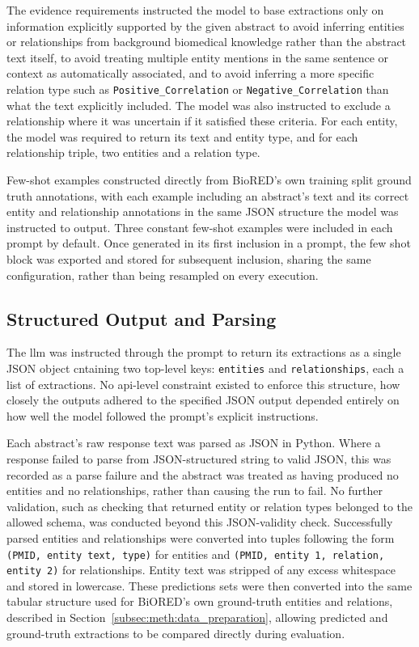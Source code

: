 The evidence requirements instructed the model to base extractions only on information explicitly supported by the given abstract to avoid inferring entities or relationships from background biomedical knowledge rather than the abstract text itself, to avoid treating multiple entity mentions in the same sentence or context as automatically associated, and to avoid inferring a more specific relation type such as \verb|Positive_Correlation| or \verb|Negative_Correlation| than what the text explicitly included. The model was also instructed to exclude a relationship where it was uncertain if it satisfied these criteria. For each entity, the model was required to return its text and entity type, and for each relationship triple, two entities and a relation type.

Few-shot examples constructed directly from BioRED's own training split ground truth annotations, with each example including an abstract's text and its correct entity and relationship annotations in the same JSON structure the model was instructed to output. Three constant few-shot examples were included in each prompt by default. Once generated in its first inclusion in a prompt, the few shot block was exported and stored for subsequent inclusion, sharing the same configuration, rather than being resampled on every execution.

\subsection{Structured Output and Parsing}
\label{subsec:meth:structured_output_and_parsing}
The \gls{llm} was instructed through the prompt to return its extractions as a single JSON object cntaining two top-level keys: \texttt{entities} and \texttt{relationships}, each a list of extractions. No \gls{api}-level constraint existed to enforce this structure, how closely the outputs adhered to the specified JSON output depended entirely on how well the model followed the prompt's explicit instructions.

Each abstract's raw response text was parsed as JSON in Python. Where a response failed to parse from JSON-structured string to valid JSON, this was recorded as a parse failure and the abstract was treated as having produced no entities and no relationships, rather than causing the run to fail. No further validation, such as checking that returned entity or relation types belonged to the allowed schema, was conducted beyond this JSON-validity check. Successfully parsed entities and relationships were converted into tuples following the form \texttt{(PMID, entity text, type)} for entities and \texttt{(PMID, entity 1, relation, entity 2)} for relationships. Entity text was stripped of any excess whitespace and stored in lowercase. These predictions sets were then converted into the same tabular structure used for BiORED's own ground-truth entities and relations, described in Section~\ref{subsec:meth:data_preparation}, allowing predicted and ground-truth extractions to be compared directly during evaluation.

